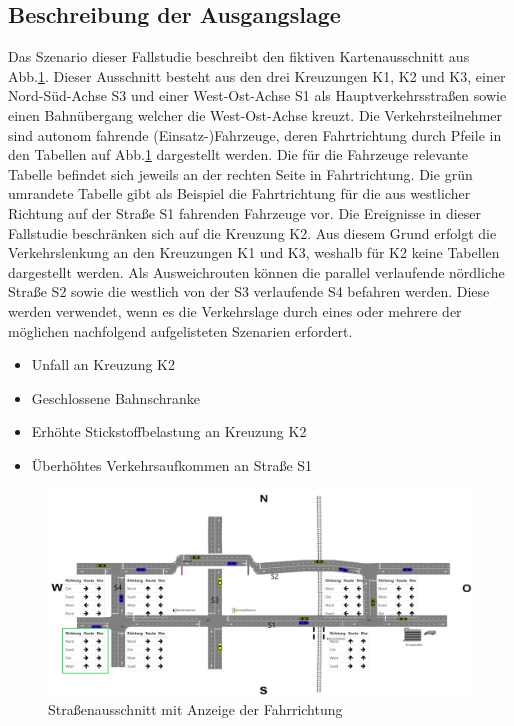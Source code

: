\subsection{Beschreibung der Ausgangslage}
Das Szenario dieser Fallstudie beschreibt den fiktiven Kartenausschnitt aus Abb.\ref{fig2}. Dieser Ausschnitt besteht aus den drei Kreuzungen K1, K2 und K3, einer Nord-Süd-Achse S3 und einer West-Ost-Achse S1 als Hauptverkehrsstraßen sowie einen Bahnübergang welcher die West-Ost-Achse kreuzt. Die Verkehrsteilnehmer sind autonom fahrende (Einsatz-)Fahrzeuge, deren Fahrtrichtung durch Pfeile in den Tabellen auf Abb.\ref{fig2} dargestellt werden. Die für die Fahrzeuge relevante Tabelle befindet sich jeweils an der rechten Seite in Fahrtrichtung. Die grün umrandete Tabelle gibt als Beispiel die Fahrtrichtung für die aus westlicher Richtung auf der Straße S1 fahrenden Fahrzeuge vor. Die Ereignisse in dieser Fallstudie beschränken sich auf die Kreuzung K2. Aus diesem Grund erfolgt die Verkehrslenkung an den Kreuzungen K1 und K3, weshalb für K2 keine Tabellen dargestellt werden. Als Ausweichrouten können die parallel verlaufende nördliche Straße S2 sowie die westlich von der S3 verlaufende S4 befahren werden. Diese werden verwendet, wenn es die Verkehrslage durch eines oder mehrere der möglichen nachfolgend aufgelisteten Szenarien erfordert.

\begin{itemize} 
\item Unfall an Kreuzung K2
\item Geschlossene Bahnschranke
\item Erhöhte Stickstoffbelastung an Kreuzung K2
\item Überhöhtes Verkehrsaufkommen an Straße S1
\end{itemize}

\begin{figure}[ht]
	\includegraphics[width=\textwidth]{images/dataanalyticswebapp.png}
	\caption{Straßenausschnitt mit Anzeige der Fahrrichtung}
	\label{fig2}
\end{figure}

